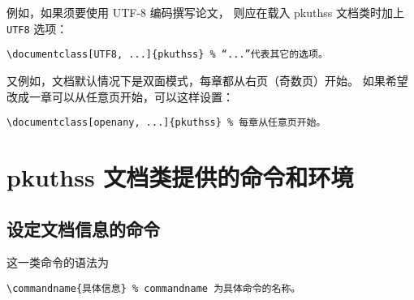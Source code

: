 例如，如果须要使用 UTF-8 编码撰写论文，
则应在载入 pkuthss 文档类时加上 \verb|UTF8| 选项：
\begin{Verbatim}
\documentclass[UTF8, ...]{pkuthss} % “...”代表其它的选项。
\end{Verbatim}

又例如，文档默认情况下是双面模式，每章都从右页（奇数页）开始。
如果希望改成一章可以从任意页开始，可以这样设置：
\begin{Verbatim}
\documentclass[openany, ...]{pkuthss} % 每章从任意页开始。
\end{Verbatim}

\section{pkuthss 文档类提供的命令和环境}
\subsection{设定文档信息的命令}\label{ssec:set-cmd}

这一类命令的语法为
\begin{Verbatim}
\commandname{具体信息} % commandname 为具体命令的名称。
\end{Verbatim}

